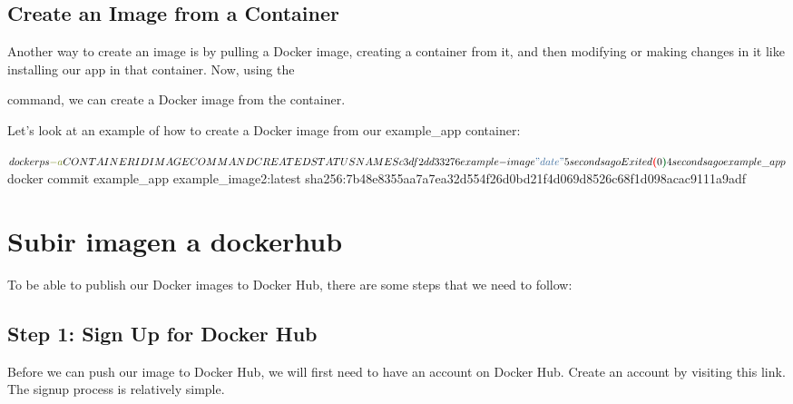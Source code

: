 \documentclass[
]{article}
\newenvironment{Shaded}{\begin{snugshade}}{\end{snugshade}}
\newcommand{\AttributeTok}[1]{\textcolor[rgb]{0.49,0.56,0.16}{#1}}
\newcommand{\ErrorTok}[1]{\textcolor[rgb]{1.00,0.00,0.00}{\textbf{#1}}}
\newcommand{\ExtensionTok}[1]{#1}
\newcommand{\KeywordTok}[1]{\textcolor[rgb]{0.00,0.44,0.13}{\textbf{#1}}}
\newcommand{\NormalTok}[1]{#1}
\newcommand{\StringTok}[1]{\textcolor[rgb]{0.25,0.44,0.63}{#1}}
\let\oldtexttt\texttt
\renewcommand{\texttt}[1]{
    \tcbox{\oldtexttt{#1}} 
}
\begin{document}
\hypertarget{create-an-image-from-a-container}{%
\subsection{Create an Image from a
Container}\label{create-an-image-from-a-container}}

Another way to create an image is by pulling a Docker image, creating a
container from it, and then modifying or making changes in it like
installing our app in that container. Now, using the
\texttt{docker\ commit} command, we can create a Docker image from the
container.

Let’s look at an example of how to create a Docker image from our
example\_app container:

\begin{Shaded}
\begin{Highlighting}[]
\ExtensionTok{$}\NormalTok{ docker ps }\AttributeTok{{-}a}
\ExtensionTok{CONTAINER}\NormalTok{ ID     IMAGE      COMMAND    CREATED               STATUS              NAMES}
\ExtensionTok{c3df2dd33276}\NormalTok{  example{-}image }\StringTok{"date"}\NormalTok{  5 seconds ago   Exited }\ErrorTok{(}\ExtensionTok{0}\KeywordTok{)} \ExtensionTok{4}\NormalTok{ seconds ago  example\_app}

\ExtensionTok{$}\NormalTok{ docker commit example\_app example\_image2:latest}
\ExtensionTok{sha256:7b48e8355aa7a7ea32d554f26d0bd21f4d069d8526c68f1d098acac9111a9adf}
\end{Highlighting}
\end{Shaded}

\hypertarget{subir-imagen-a-dockerhub}{%
\section{Subir imagen a dockerhub}\label{subir-imagen-a-dockerhub}}

To be able to publish our Docker images to Docker Hub, there are some
steps that we need to follow:

\hypertarget{step-1-sign-up-for-docker-hub}{%
\subsection{Step 1: Sign Up for Docker
Hub}\label{step-1-sign-up-for-docker-hub}}

Before we can push our image to Docker Hub, we will first need to have
an account on Docker Hub. Create an account by visiting this link. The
signup process is relatively simple.
\end{document}
